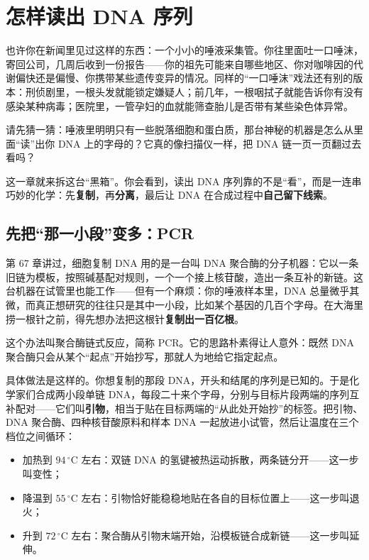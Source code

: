 \chapter{怎样读出 DNA 序列}

\begin{kaichang}
也许你在新闻里见过这样的东西：一个小小的唾液采集管。你往里面吐一口唾沫，寄回公司，几周后收到一份报告——你的祖先可能来自哪些地区、你对咖啡因的代谢偏快还是偏慢、你携带某些遗传变异的情况。同样的“一口唾沫”戏法还有别的版本：刑侦剧里，一根头发就能锁定嫌疑人；前几年，一根咽拭子就能告诉你有没有感染某种病毒；医院里，一管孕妇的血就能筛查胎儿是否带有某些染色体异常。

请先猜一猜：唾液里明明只有一些脱落细胞和蛋白质，那台神秘的机器是怎么从里面“读”出你 DNA 上的字母的？它真的像扫描仪一样，把 DNA 链一页一页翻过去看吗？

这一章就来拆这台“黑箱”。你会看到，读出 DNA 序列靠的不是“看”，而是一连串巧妙的化学：先\textbf{复制}，再\textbf{分离}，最后让 DNA 在合成过程中\textbf{自己留下线索}。
\end{kaichang}

\section{先把“那一小段”变多：PCR}

第 67 章讲过，细胞复制 DNA 用的是一台叫 DNA 聚合酶的分子机器：它以一条旧链为模板，按照碱基配对规则，一个一个接上核苷酸，造出一条互补的新链。这台机器在试管里也能工作——但有一个麻烦：你的唾液样本里，DNA 总量微乎其微，而真正想研究的往往只是其中一小段，比如某个基因的几百个字母。在大海里捞一根针之前，得先想办法把这根针\textbf{复制出一百亿根}。

这个办法叫聚合酶链式反应，简称 PCR。它的思路朴素得让人意外：既然 DNA 聚合酶只会从某个“起点”开始抄写，那就人为地给它指定起点。

具体做法是这样的。你想复制的那段 DNA，开头和结尾的序列是已知的。于是化学家们合成两小段单链 DNA，每段二十来个字母，分别与目标片段两端的序列互补配对——它们叫\textbf{引物}，相当于贴在目标两端的“从此处开始抄”的标签。把引物、DNA 聚合酶、四种核苷酸原料和样本 DNA 一起放进小试管，然后让温度在三个档位之间循环：

\begin{itemize}[itemsep=2pt]
\item 加热到 $94\,^{\circ}\mathrm{C}$ 左右：双链 DNA 的氢键被热运动拆散，两条链分开——这一步叫变性；
\item 降温到 $55\,^{\circ}\mathrm{C}$ 左右：引物恰好能稳稳地贴在各自的目标位置上——这一步叫退火；
\item 升到 $72\,^{\circ}\mathrm{C}$ 左右：聚合酶从引物末端开始，沿模板链合成新链——这一步叫延伸。
\end{itemize}

